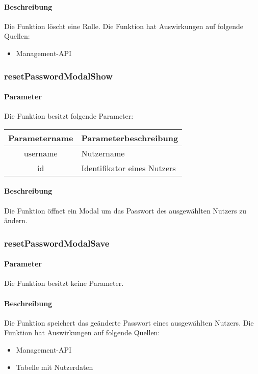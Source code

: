 \paragraph{Beschreibung} Die Funktion löscht eine Rolle. Die Funktion hat Auswirkungen auf folgende Quellen:
\begin{itemize}
	\item Management-API
\end{itemize}
\subsubsection{resetPasswordModalShow}
\paragraph{Parameter} Die Funktion besitzt folgende Parameter:
\begin{table}[H]
	\begin{tabular}{|c|p{11cm}|}
		\hline
		\textbf{Parametername} & \textbf{Parameterbeschreibung} \\ \hline
		username & Nutzername \\ \hline
		id       & Identifikator eines Nutzers \\ \hline
	\end{tabular}
\end{table}
\paragraph{Beschreibung} Die Funktion öffnet ein Modal um das Passwort des ausgewählten Nutzers zu ändern. 
\subsubsection{resetPasswordModalSave}
\paragraph{Parameter} Die Funktion besitzt keine Parameter.
\paragraph{Beschreibung} Die Funktion speichert das geänderte Passwort eines ausgewählten Nutzers. Die Funktion hat Auswirkungen auf folgende Quellen:
\begin{itemize}
	\item Management-API
	\item Tabelle mit Nutzerdaten
\end{itemize}
